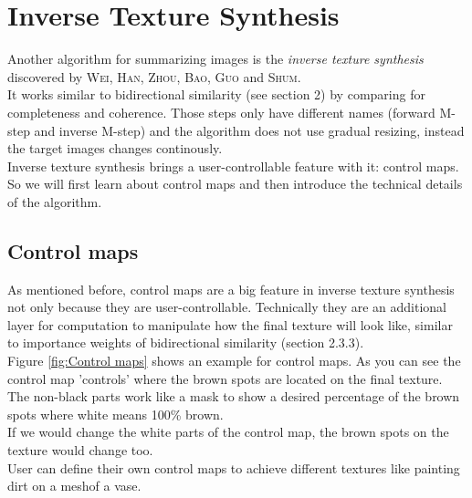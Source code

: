 \section{Inverse Texture Synthesis}
Another algorithm for summarizing images is the \textit{inverse texture synthesis} discovered by \textsc{Wei, Han, Zhou, Bao, Guo} and \textsc{Shum}.\\
It works similar to bidirectional similarity (see section 2) by comparing for completeness and coherence. Those steps only have different names (forward M-step and inverse M-step) and the algorithm does not use gradual resizing, instead the target images changes continously. \\
Inverse texture synthesis brings a user-controllable feature with it: control maps. So we will first learn about control maps and then introduce the technical details of the algorithm.

\subsection{Control maps}
As mentioned before, control maps are a big feature in inverse texture synthesis not only because they are user-controllable. Technically they are an additional layer for computation to manipulate how the final texture will look like, similar to importance weights of bidirectional similarity (section 2.3.3).\\
Figure \ref{fig:Control maps} shows an example for control maps. As you can see the control map 'controls' where the brown spots are located on the final texture. The non-black parts work like a mask to show a desired percentage of the brown spots where white means 100\% brown.\\
If we would change the white parts of the control map, the brown spots on the texture would change too.\\
User can define their own control maps to achieve different textures like painting dirt on a mesh\footnotemark  of a vase. 


